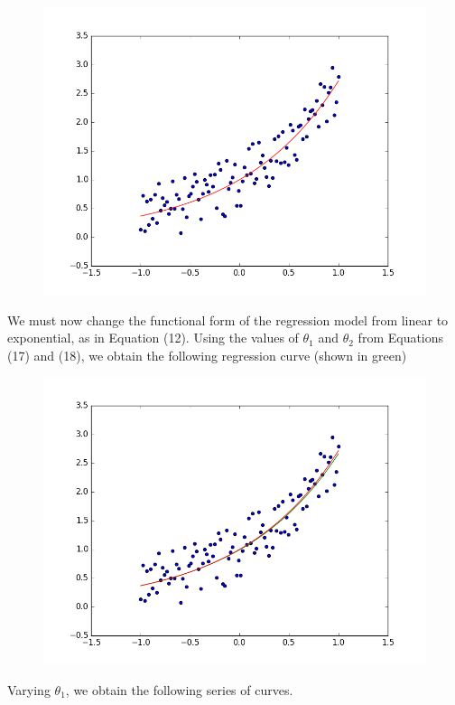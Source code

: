 \documentclass[10pt]{article}
\begin{document}
\begin{figure}[H]
\includegraphics[scale=0.4]{expNoise.png}
\end{figure}
We must now change the functional form of the regression model from linear to exponential, as in Equation (12). Using the values of $\theta_{1}$ and $\theta_{2}$ from Equations (17) and (18), we obtain the following regression curve (shown in green)
\begin{figure}[H]
\includegraphics[scale=0.4]{expNoiseWithRegression.png}
\end{figure}
\newpage
Varying $\theta_{1}$, we obtain the following series of curves.
\end{document}
